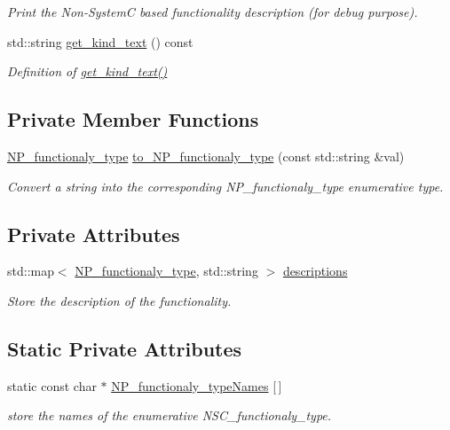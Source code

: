 \begin{DoxyCompactItemize}
\begin{DoxyCompactList}\small\item\em Print the Non-\/\+SystemC based functionality description (for debug purpose). \end{DoxyCompactList}\item 
std\+::string \hyperlink{classNP__functionality_abb6480b8bf9edc6a6f1aaaf7781029ae}{get\+\_\+kind\+\_\+text} () const
\begin{DoxyCompactList}\small\item\em Definition of \hyperlink{classNP__functionality_abb6480b8bf9edc6a6f1aaaf7781029ae}{get\+\_\+kind\+\_\+text()} \end{DoxyCompactList}\end{DoxyCompactItemize}
\subsection*{Private Member Functions}
\begin{DoxyCompactItemize}
\item 
\hyperlink{classNP__functionality_a318d6f254060bfdf145ebeb41efe772e}{N\+P\+\_\+functionaly\+\_\+type} \hyperlink{classNP__functionality_a788fc254520907f4c8ef0d4182f7cc79}{to\+\_\+\+N\+P\+\_\+functionaly\+\_\+type} (const std\+::string \&val)
\begin{DoxyCompactList}\small\item\em Convert a string into the corresponding N\+P\+\_\+functionaly\+\_\+type enumerative type. \end{DoxyCompactList}\end{DoxyCompactItemize}
\subsection*{Private Attributes}
\begin{DoxyCompactItemize}
\item 
std\+::map$<$ \hyperlink{classNP__functionality_a318d6f254060bfdf145ebeb41efe772e}{N\+P\+\_\+functionaly\+\_\+type}, std\+::string $>$ \hyperlink{classNP__functionality_a55a88b3aedde2d4c7c569f9a9f68047b}{descriptions}
\begin{DoxyCompactList}\small\item\em Store the description of the functionality. \end{DoxyCompactList}\end{DoxyCompactItemize}
\subsection*{Static Private Attributes}
\begin{DoxyCompactItemize}
\item 
static const char $\ast$ \hyperlink{classNP__functionality_a742cf4b8ee952fdaee3b157f9313820c}{N\+P\+\_\+functionaly\+\_\+type\+Names} \mbox{[}$\,$\mbox{]}
\begin{DoxyCompactList}\small\item\em store the names of the enumerative N\+S\+C\+\_\+functionaly\+\_\+type. \end{DoxyCompactList}\end{DoxyCompactItemize}


